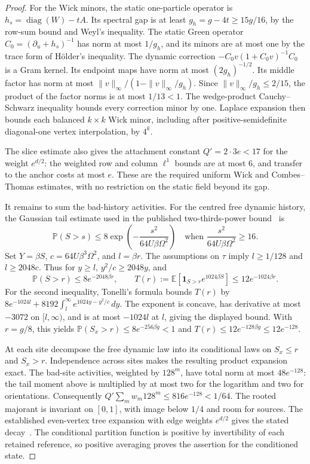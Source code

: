 \documentclass[11pt]{article}
\theoremstyle{definition}
\theoremstyle{remark}
\begin{document}
\begin{proof}[Proof]
For the Wick minors, the static one-particle operator is $h_s=\operatorname{diag}(W)-tA$. Its spectral gap is at least $g_h=g-4t\geq15g/16$, by the row-sum bound and Weyl's inequality.
The static Green operator $C_0=(\partial_u+h_s)^{-1}$ has norm at most $1/g_h$, and its minors are at most one by the trace form of H\"older's inequality.
The dynamic correction $-C_0v(1+C_0v)^{-1}C_0$ is a Gram kernel. Its endpoint maps have norm at most $(2g_h)^{-1/2}$. Its middle factor has norm at most $\|v\|_\infty/(1-\|v\|_\infty/g_h)$. Since $\|v\|_\infty/g_h\leq2/15$, the product of the factor norms is at most $1/13<1$.
The wedge-product Cauchy--Schwarz inequality bounds every correction minor by one. Laplace expansion then bounds each balanced $k\times k$ Wick minor, including after positive-semidefinite diagonal-one vertex interpolation, by $4^k$.

The slice estimate also gives the attachment constant $Q'=2\cdot3e<17$ for the weight $e^{d/2}$: the weighted row and column $\ell^1$ bounds are at most $6$, and transfer to the anchor costs at most $e$. These are the required uniform Wick and Combes--Thomas estimates, with no restriction on the static field beyond its gap.

It remains to sum the bad-history activities. For the centred free dynamic history, the Gaussian tail estimate used in the published two-thirds-power bound~\cite{linear4} is
\[
 \mathbb P(S>s)\leq8\exp\!\left(-\frac{s^2}{64U\beta\Omega^2}\right)
 \quad\text{when }\frac{s^2}{64U\beta\Omega^2}\geq16.
\]
Set $Y=\beta S$, $c=64U\beta^3\Omega^2$, and $l=\beta r$. The assumptions on $\tau$ imply $l\geq1/128$ and $l\geq2048c$. Thus for $y\geq l$, $y^2/c\geq2048y$, and
\[
 \mathbb P(S>r)\leq8e^{-2048\beta r},\qquad
 T(r):=\mathbb E[\mathbf 1_{S>r}e^{1024\beta S}]\leq12e^{-1024\beta r}.
\]
For the second inequality, Tonelli's formula bounds $T(r)$ by $8e^{-1024l}+8192\int_l^\infty e^{1024y-y^2/c}\,dy$. The exponent is concave, has derivative at most $-3072$ on $[l,\infty)$, and is at most $-1024l$ at $l$, giving the displayed bound. With $r=g/8$, this yields $\mathbb P(S_x>r)\leq8e^{-256\beta g}<1$ and $T(r)\leq12e^{-128\beta g}\leq12e^{-128}$.

At each site decompose the free dynamic law into its conditional laws on $S_x\leq r$ and $S_x>r$. Independence across sites makes the resulting product expansion exact. The bad-site activities, weighted by $128^m$, have total norm at most $48e^{-128}$: the tail moment above is multiplied by at most two for the logarithm and two for orientations. Consequently $Q'\sum_mw_m128^m\leq816e^{-128}<1/64$. The rooted majorant is invariant on $[0,1]$, with image below $1/4$ and room for sources. The established even-vertex tree expansion with edge weights $e^{d/2}$ gives the stated decay~\cite{linear4}. The conditional partition function is positive by invertibility of each retained reference, so positive averaging proves the assertion for the conditioned state.
\end{proof}
\end{document}
